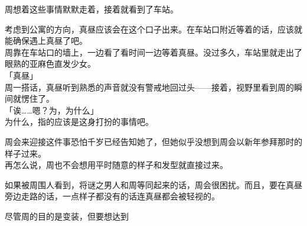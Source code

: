 周想着这些事情默默走着，接着就看到了车站。

考虑到公寓的方向，真昼应该会在这个口子出来。在车站口附近等着的话，应该就能确保遇上真昼了吧。\\

周靠在车站口的墙上，一边看了看时间一边等着真昼。没过多久，车站里就走出了眼熟的亚麻色直发少女。\\

「真昼」\\

周一搭话，真昼听到熟悉的声音就没有警戒地回过头——接着，视野里看到周的瞬间就愣住了。\\

「诶……嗯？为，为什么」\\

为什么，指的应该是这身打扮的事情吧。

周会来迎接这件事恐怕千岁已经告知她了，但她似乎没想到周会以新年参拜那时的样子过来。\\

再怎么说，周也不会想用平时随意的样子和发型就直接过来。

如果被周围人看到，将谜之男人和周等同起来的话，周会很困扰。而且，要在真昼旁边走路的话，一点样子都没有的话连真昼都会被轻视的。

尽管周的目的是变装，但要想达到



